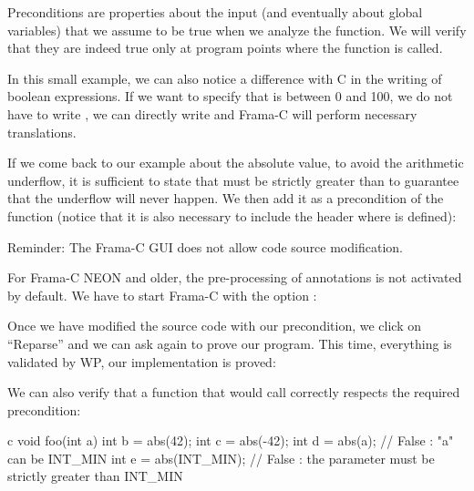 Preconditions are properties about the input (and eventually about
global variables) that we assume to be true when we analyze the
function. We will verify that they are indeed true only at program
points where the function is called.



In this small example, we can also notice a difference with C in the
writing of boolean expressions. If we want to specify that  is
between 0 and 100, we do not have to write ,
we can directly write  and Frama-C will
perform necessary translations.



If we come back to our example about the absolute value, to avoid the
arithmetic underflow, it is sufficient to state that  must
be strictly greater than  to guarantee that the
underflow will never happen. We then add it as a precondition of the
function (notice that it is also necessary to include the header where
 is defined):






\begin{Warning}
  Reminder: The Frama-C GUI does not allow code source modification.
\end{Warning}


\begin{Information}
  For Frama-C NEON and older, the
  pre-processing of annotations is not activated by default. We
  have to start Frama-C with the option :

\end{Information}


Once we have modified the source code with our precondition, we click on
``Reparse'' and we can ask again to prove our program. This time,
everything is validated by WP, our implementation is proved:





We can also verify that a function that would call 
correctly respects the required precondition:



\begin{CodeBlock}{c}
void foo(int a){
   int b = abs(42);
   int c = abs(-42);
   int d = abs(a);       // False : "a" can be INT_MIN
   int e = abs(INT_MIN); // False : the parameter must be strictly greater than INT_MIN
}
\end{CodeBlock}



